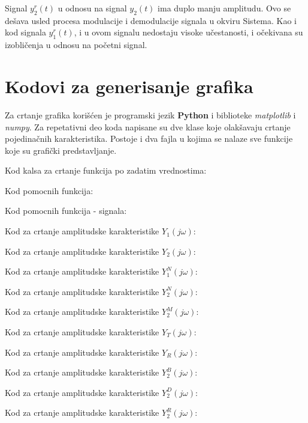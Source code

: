 \documentclass[titlepage,a4paper,12pt]{article}
\begin{document}
	Signal  $y_2^r(t)$ u odnosu na signal $y_2(t)$ ima duplo manju amplitudu. Ovo se dešava usled procesa modulacije i demodulacije signala u okviru Sistema. Kao i kod signala $y_1^r(t)$, i u ovom signalu nedostaju visoke učestanosti, i očekivana su izobličenja u odnosu na početni signal.
	
	\section{Kodovi za generisanje grafika}
	Za crtanje grafika korišćen je programski jezik \textbf{Python} i biblioteke \emph{matplotlib} i \emph{numpy}. Za repetativni deo koda napisane su dve klase koje olakšavaju crtanje pojedinačnih karakteristika. Postoje i dva fajla u kojima se nalaze sve funkcije koje su grafički predstavljanje.
	
	\bigskip
	\noindent Kod kalsa za crtanje funkcija po zadatim vrednostima:
	
	Kod pomocnih funkcija:
	
	Kod pomocnih funkcija - signala:
	
	Kod za crtanje amplitudske karakteristike $Y_1(j\omega)$: 
	
	Kod za crtanje amplitudske karakteristike $Y_2(j\omega):$ 
	
	Kod za crtanje amplitudske karakteristike $Y_1^N(j\omega):$ 
	
	Kod za crtanje amplitudske karakteristike $Y_2^N(j\omega):$ 
	
	Kod za crtanje amplitudske karakteristike $Y_2^M(j\omega):$ 
	
	Kod za crtanje amplitudske karakteristike $Y_T(j\omega):$ 
	
	Kod za crtanje amplitudske karakteristike $Y_R(j\omega):$ 
	
	Kod za crtanje amplitudske karakteristike $Y_2^B(j\omega):$ 
	
	Kod za crtanje amplitudske karakteristike $Y_2^D(j\omega):$ 
	
	Kod za crtanje amplitudske karakteristike $Y_2^R(j\omega):$ 
	
	

	\clearpage
	\lstlistoflistings
	
\end{document}
